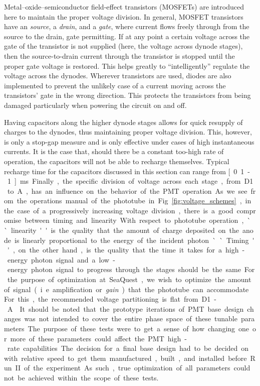 Metal–oxide–semiconductor field-effect transistors (MOSFETs) are introduced here to maintain the proper voltage division. In general, MOSFET transistors have an \emph{source}, a \emph{drain}, and a \emph{gate}, where current flows freely through from the source to the drain, gate permitting. If at any point a certain voltage across the gate of the transistor is not supplied (here, the voltage across dynode stages), then the source-to-drain current through the transistor is stopped until the proper gate voltage is restored. This helps greatly to ``intelligently'' regulate the voltage across the dynodes. Wherever transistors are used, diodes are also implemented to prevent the unlikely case of a current moving across the transistors' gate in the wrong direction. This protects the transistors from being damaged particularly when powering the circuit on and off.

Having capacitors along the higher dynode stages allows for quick resupply of charges to the dynodes, thus maintaining proper voltage division. This, however, is only a stop-gap measure and is only effective under cases of high instantaneous currents. It is the case that, should there be a constant too-high rate of operation, the capacitors will not be able to recharge themselves. Typical recharge time for the capacitors discussed in this section can range from \unit[0.1-1]{ms}.

Finally, the specific division of voltage across each stage, from D1 to A, has an influence on the behavior of the PMT operation. As we see from the operations manual of the phototube in Fig.~\ref{fig:voltage_schemes}, in the case of a progressively increasing voltage division, there is a good compromise between timing and linearity. With respect to phototube operation, ``linearity'' is the quality that the amount of charge deposited on the anode is linearly proportional to the energy of the incident photon. ``Timing'', on the other hand, is the quality that the time it takes for a high-energy photon signal and a low-energy photon signal to progress through the stages should be the same. For the purpose of optimization at SeaQuest, we wish to optimize the amount of signal (i.e. amplification or \emph{gain}) that the phototube can accommodate. For this, the recommended voltage partitioning is flat from D1-A~\cite{tubespecs}.

It should be noted that the prototype iterations of PMT base design changes was not intended to cover the entire phase space of these tunable parameters. The purpose of these tests were to get a sense of how changing one or more of these parameters could affect the PMT high-rate capabilities. The decision for a final base design had to be decided on with relative speed to get them manufactured, built, and installed before Run II of the experiment. As such, true optimization of all parameters could not be achieved within the scope of these tests.

